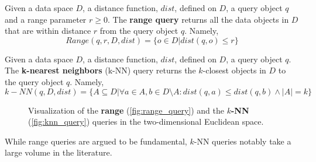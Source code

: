 \begin{definition}
Given a data space $D$, a distance function, $dist$, defined on $D$, a query object $q$ and a range parameter $r \geq 0$. The \textbf{range query} returns all the data objects in $D$ that are within distance $r$ from the query object $q$. Namely,
\begin{equation}
Range(q,r,D,dist)=\{o \in D | dist(q,o) \leq r \}
\end{equation}
\label{def:range_query} 
\end{definition}

\begin{definition}
Given a data space $D$, a distance function, $dist$, defined on $D$, a query object $q$. The \textbf{k-nearest neighbors} (k-NN) query returns the $k$-closest objects in $D$ to the query object $q$. Namely,
\begin{equation}
k-NN(q,D,dist)=\{A \subseteq D | \forall a \in A, b \in D \setminus A: dist(q,a) \leq dist(q,b) \wedge |A|=k \}
\end{equation}
\label{def:knn_query} 
\end{definition}

\begin{figure}[h!]
	\centering
    \caption{Visualization of the \textbf{range} (\ref{fig:range_query}) and the \textbf{$k$-NN} (\ref{fig:knn_query}) queries in the two-dimensional Euclidean space.}
   \label{fig:similarity_query_types}
\end{figure}
While range queries are argued to be fundamental, $k$-NN queries notably take a large volume in the literature.

